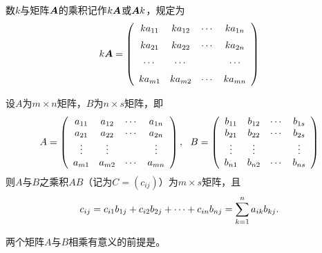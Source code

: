\begin{frame}
\begin{dingyi}[矩阵的数乘]
  数$k$与矩阵$\boldsymbol{A}$的乘积记作$k \boldsymbol{A}$或$\boldsymbol{A} k$，规定为
  $$
  k \boldsymbol{A} = 
  \left(
    \begin{array}{cccc}
      k a_{11}   & k a_{12}   & \cdots & k a_{1n}  \\[0.2cm]
      k a_{21}   & k a_{22}   & \cdots & k a_{2n}  \\[0.2cm]
      \cdots     & \cdots     &     & \cdots    \\[0.2cm]
      k a_{m1}   & k a_{m2}   & \cdots & k a_{mn}  
    \end{array}
  \right)
  $$
\end{dingyi}

\begin{zhu*}
\end{zhu*}
\end{frame}

\begin{frame}
\begin{dingyi}[矩阵乘法]
  设$A$为$m\times n$矩阵，$B$为$n\times s$矩阵，即
  $$
  A = \left(
    \begin{array}{cccc}
      a_{11} & a_{12} & \cdots & a_{1n}\\
      a_{21} & a_{22} & \cdots & a_{2n}\\
      \vdots   & \vdots   &     & \vdots \\
      a_{m1} & a_{m2} & \cdots & a_{mn}
    \end{array}
  \right), ~~
  B = \left(
    \begin{array}{cccc}
      b_{11} & b_{12} & \cdots & b_{1s}\\
      b_{21} & b_{22} & \cdots & b_{2s}\\
      \vdots   & \vdots   &     & \vdots \\
      b_{n1} & b_{n2} & \cdots & b_{ns}
    \end{array}
  \right)
  $$
  则$A$与$B$之乘积$AB$（记为$C=(c_{ij})$）为$m\times s$矩阵，且
  $$
  c_{ij} = c_{i1}b_{1j} + c_{i2}b_{2j} + \cdots + c_{in}b_{nj} = \sum_{k=1}^na_{ik}b_{kj}.
  $$
\end{dingyi}
\begin{zhu*}
  两个矩阵$A$与$B$相乘有意义的前提是。
\end{zhu*}
\end{frame}

